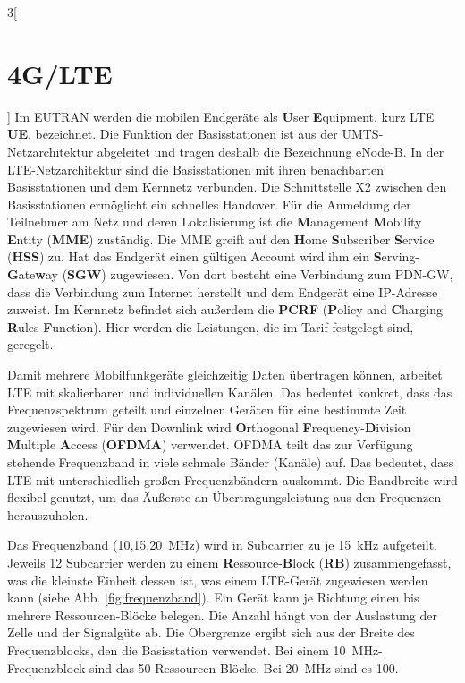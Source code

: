 \begin{multicols}{3}[\section{4G/LTE}]
Im EUTRAN werden die mobilen Endgeräte als \textbf{U}ser \textbf{E}quipment, kurz LTE \textbf{UE}, bezeichnet. Die Funktion der Basisstationen ist aus der UMTS-Netzarchitektur abgeleitet und tragen deshalb die Bezeichnung eNode-B. In der LTE-Netzarchitektur sind die Basisstationen mit ihren benachbarten Basisstationen und dem Kernnetz verbunden. Die Schnittstelle X2 zwischen den Basisstationen ermöglicht ein schnelles Handover.
Für die Anmeldung der Teilnehmer am Netz und deren Lokalisierung ist die \textbf{M}anagement \textbf{M}obility \textbf{E}ntity (\textbf{MME}) zuständig. Die MME greift auf den \textbf{H}ome \textbf{S}ubscriber \textbf{S}ervice (\textbf{HSS}) zu. Hat das Endgerät einen gültigen Account wird ihm ein \textbf{S}erving-\textbf{G}ate\textbf{w}ay (\textbf{SGW}) zugewiesen. Von dort besteht eine Verbindung zum PDN-GW, dass die Verbindung zum Internet herstellt und dem Endgerät eine IP-Adresse zuweist.
Im Kernnetz befindet sich außerdem die \textbf{PCRF} (\textbf{P}olicy and \textbf{C}harging \textbf{R}ules \textbf{F}unction). Hier werden die Leistungen, die im Tarif festgelegt sind, geregelt. ~\cite{4GLTE.3}

Damit mehrere Mobilfunkgeräte gleichzeitig Daten übertragen können, arbeitet LTE mit skalierbaren und individuellen Kanälen. Das bedeutet konkret, dass das Frequenzspektrum geteilt und einzelnen Geräten für eine bestimmte Zeit zugewiesen wird.
Für den Downlink wird \textbf{O}rthogonal \textbf{F}requency-\textbf{D}ivision \textbf{M}ultiple \textbf{A}ccess (\textbf{OFDMA}) verwendet. OFDMA teilt das zur Verfügung stehende Frequenzband in viele schmale Bänder (Kanäle) auf. Das bedeutet, dass LTE mit unterschiedlich großen Frequenzbändern auskommt. Die Bandbreite wird flexibel genutzt, um das Äußerste an Übertragungsleistung aus den Frequenzen herauszuholen.

Das Frequenzband (\si{10},\si{15},\SI{20}{\mega\hertz}) wird in Subcarrier zu je \SI{15}{\kilo\hertz} aufgeteilt. Jeweils 12 Subcarrier werden zu einem \textbf{R}essource-\textbf{B}lock (\textbf{RB}) zusammengefasst, was die kleinste Einheit dessen ist, was einem LTE-Gerät zugewiesen werden kann (siehe Abb. \ref{fig:frequenzband}). Ein Gerät kann je Richtung einen bis mehrere Ressourcen-Blöcke belegen. Die Anzahl hängt von der Auslastung der Zelle und der Signalgüte ab. Die Obergrenze ergibt sich aus der Breite des Frequenzblocks, den die Basisstation verwendet. Bei einem \SI{10}{\mega\hertz}-Frequenzblock sind das 50 Ressourcen-Blöcke. Bei \SI{20}{\mega\hertz} sind es 100.


\end{multicols}
